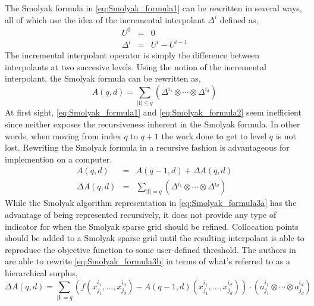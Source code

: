 The Smolyak formula in \ref{eq:Smolyak_formula1} can be rewritten in several ways, all of which use the idea of the incremental interpolant $\Delta^i$ defined as,
\begin{eqnarray} \label{eq:incremental_interpolant}
    U^0 &=& 0 \nonumber \\
    \Delta^i &=& U^i - U^{i-1}
\end{eqnarray}
The incremental interpolant operator is simply the difference between interpolants at two succesive levels. Using the notion of the incremental interpolant, the Smolyak formula can be rewritten as,
\begin{equation} \label{eq:Smolyak_formula2}
    A\left(q,d\right) =
     \sum_{\vert\textbf{i}\vert\leq q}
      \left(\Delta^{i_1}\otimes\cdots\otimes\Delta^{i_d}\right)
\end{equation}   
At first sight, \ref{eq:Smolyak_formula1} and \ref{eq:Smolyak_formula2} seem inefficient since neither exposes the recursiveness inherent in the Smolyak formula. In other words, when moving from index $q$ to $q+1$ the work done to get to level $q$ is not lost. Rewriting the Smolyak formula in a recursive fashion is advantageous for implemention on a computer.
\begin{eqnarray}
\label{eq:Smolyak_formula3a}
    A(q,d) &=& A(q-1,d) + \Delta A(q,d) \\
\label{eq:Smolyak_formula3b}
    \Delta A(q,d) &=& \sum_{\vert\textbf{i}\vert = q}
     \left(\Delta^{i_1}\otimes\cdots\otimes\Delta^{i_d}\right)
\end{eqnarray}
While the Smolyak algorithm representation in \ref{eq:Smolyak_formula3a} has the advantage of being represented recursively, it does not provide any type of indicator for when the Smolyak sparse grid should be refined. Collocation points should be added to a Smolyak sparse grid until the resulting interpolant is able to reproduce the objective function to some user-defined threshold. The authors in \cite{AHSGC} are able to rewrite \ref{eq:Smolyak_formula3b} in terms of what's referred to as a hierarchical surplus, 
\begin{equation} \label{eq:hierarchical_surplus}
    \Delta A(q,d) = \sum_{\vert\textbf{i}\vert=q}
     \left(f(x_{j_1}^{i_1},...,x_{j_d}^{i_d}) - 
      A(q-1,d)(x_{j_1}^{i_1},...,x_{j_d}^{i_d})\right)\cdot
       \left(a_{j_1}^{i_1}\otimes\cdots\otimes a_{j_d}^{i_d}\right)
\end{equation}
